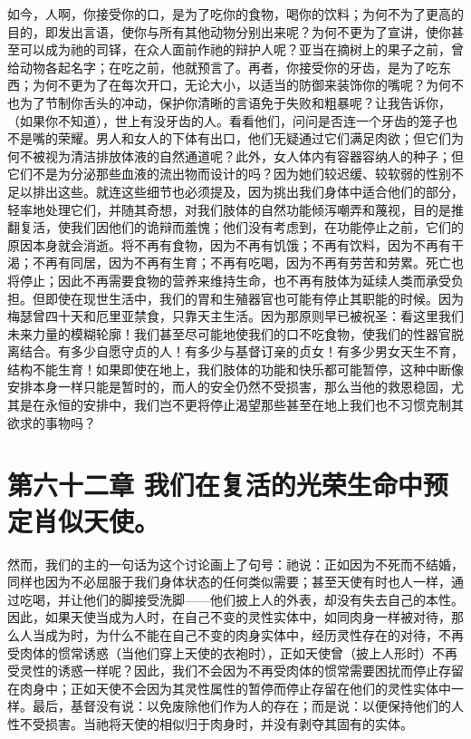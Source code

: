 如今，人啊，你接受你的口，是为了吃你的食物，喝你的饮料；为何不为了更高的目的，即发出言语，使你与所有其他动物分别出来呢？为何不更为了宣讲，使你甚至可以成为祂的司铎，在众人面前作祂的辩护人呢？亚当在摘树上的果子之前，曾给动物各起名字；在吃之前，他就预言了。再者，你接受你的牙齿，是为了吃东西；为何不更为了在每次开口，无论大小，以适当的防御来装饰你的嘴呢？为何不也为了节制你舌头的冲动，保护你清晰的言语免于失败和粗暴呢？让我告诉你，（如果你不知道），世上有没牙齿的人。看看他们，问问是否连一个牙齿的笼子也不是嘴的荣耀。男人和女人的下体有出口，他们无疑通过它们满足肉欲；但它们为何不被视为清洁排放体液的自然通道呢？此外，女人体内有容器容纳人的种子；但它们不是为分泌那些血液的流出物而设计的吗？因为她们较迟缓、较软弱的性别不足以排出这些。就连这些细节也必须提及，因为挑出我们身体中适合他们的部分，轻率地处理它们，并随其奇想，对我们肢体的自然功能倾泻嘲弄和蔑视，目的是推翻复活，使我们因他们的诡辩而羞愧；他们没有考虑到，在功能停止之前，它们的原因本身就会消逝。将不再有食物，因为不再有饥饿；不再有饮料，因为不再有干渴；不再有同居，因为不再有生育；不再有吃喝，因为不再有劳苦和劳累。死亡也将停止；因此不再需要食物的营养来维持生命，也不再有肢体为延续人类而承受负担。但即使在现世生活中，我们的胃和生殖器官也可能有停止其职能的时候。因为梅瑟曾四十天和厄里亚禁食，只靠天主生活。因为那原则早已被祝圣：看这里我们未来力量的模糊轮廓！我们甚至尽可能地使我们的口不吃食物，使我们的性器官脱离结合。有多少自愿守贞的人！有多少与基督订亲的贞女！有多少男女天生不育，结构不能生育！如果即使在地上，我们肢体的功能和快乐都可能暂停，这种中断像安排本身一样只能是暂时的，而人的安全仍然不受损害，那么当他的救恩稳固，尤其是在永恒的安排中，我们岂不更将停止渴望那些甚至在地上我们也不习惯克制其欲求的事物吗？\par


\section{第六十二章 我们在复活的光荣生命中预定肖似天使。}

然而，我们的主的一句话为这个讨论画上了句号：祂说：正如因为不死而不结婚，同样也因为不必屈服于我们身体状态的任何类似需要；甚至天使有时也人一样，通过吃喝，并让他们的脚接受洗脚——他们披上人的外表，却没有失去自己的本性。因此，如果天使当成为人时，在自己不变的灵性实体中，如同肉身一样被对待，那么人当成为时，为什么不能在自己不变的肉身实体中，经历灵性存在的对待，不再受肉体的惯常诱惑（当他们穿上天使的衣袍时），正如天使曾（披上人形时）不再受灵性的诱惑一样呢？因此，我们不会因为不再受肉体的惯常需要困扰而停止存留在肉身中；正如天使不会因为其灵性属性的暂停而停止存留在他们的灵性实体中一样。最后，基督没有说：以免废除他们作为人的存在；而是说：以便保持他们的人性不受损害。当祂将天使的相似归于肉身时，并没有剥夺其固有的实体。\par

